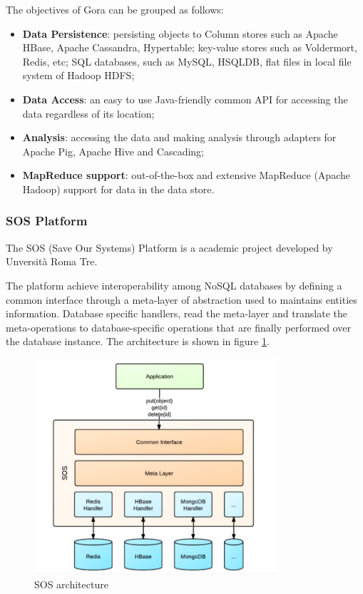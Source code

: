 \newparagraph The objectives of Gora can be grouped as follows:
\begin{itemize}
\item \textbf{Data Persistence}: persisting objects to Column stores such as Apache HBase, Apache Cassandra, Hypertable; key-value stores such as Voldermort, Redis, etc; SQL databases, such as MySQL, HSQLDB, flat files in local file system of Hadoop HDFS; 
\item \textbf{Data Access}: an easy to use Java-friendly common API for accessing the data regardless of its location; 
\item \textbf{Analysis}: accessing the data and making analysis through adapters for Apache Pig, Apache Hive and Cascading;
\item \textbf{MapReduce support}: out-of-the-box and extensive MapReduce (Apache Hadoop) support for data in the data store.
\end{itemize}

\subsubsection{SOS Platform}
The SOS (Save Our Systems) Platform \cite{paper:sos-platform} is a academic project developed by Unversit\`{a} Roma Tre.

\noindent The platform achieve interoperability among NoSQL databases by defining a common interface through a meta-layer of abstraction used to maintains entities information. Database specific handlers, read the meta-layer and translate the meta-operations to database-specific operations that are finally performed over the database instance.
The architecture is shown in figure \ref{fig:sos-architecture}.

\begin{figure}[tbh]
  \centering
  \includegraphics[width=9cm]{images/sos_architecture}
  \caption{SOS architecture \cite{paper:sos-platform}}
  \label{fig:sos-architecture}
\end{figure}

